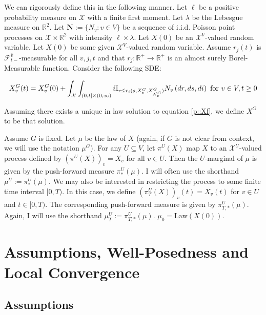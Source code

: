 \documentclass[12pt]{article}
\newcommand{\mb}{\mathbb}
\newcommand{\mc}{\mathcal}
\newcommand{\ra}{\rightarrow}
\newcommand{\ov}{\overline}
\newcommand{\te}{\text}
\newcommand{\ind}{\hspace{24pt}}
\newcommand{\defeq}{:=}								%
\newcommand{\sta}{\mc{X}}							%
\newcommand{\gneigh}[2]{\mc{N}^{#1}_{#2}}			%
\newcommand{\cl}[1]{\ov{#1}}						%
\newcommand{\Xf}{X}									%
\newcommand{\poiss}{N}								%
\newcommand{\leb}{\lambda}							%
\newcommand{\Sm}{\ell}								%
\newcommand{\rate}{r}								%
\newcommand{\F}{\mc{F}}								%
\newcommand{\m}{\mu}								%
\newcommand{\proj}{\pi}								%
\newcommand{\poisses}{\mathbf{N}}					%
\newcommand{\poissv}[1]{_{#1}}						%
\newcommand{\vind}[1]{_{#1}}						%
\newcommand{\tme}[1]{(#1)}							%
\newcommand{\gind}[1]{^{#1}}						%
\newcommand{\vpara}[1]{^{#1}}						%
\newcommand{\stpara}[1]{_{#1}}						%
\newcommand{\tpara}[1]{_{#1}}						%
\newcommand{\psf}{_*}								%
\newcommand{\tparapsf}[1]{_{#1,*}}					%
\newcommand{\tmepro}[3]{
\ifstrempty{#3}{
	(#1,#2)}{
	(#1,#2,#3)}}									%
\newcommand{\law}{\te{Law}}							%
\begin{document}
\ind We can rigorously define this in the following manner. Let \(\Sm\) be a positive probability measure on \(\sta\) with a finite first moment. Let \(\leb\) be the Lebesgue measure on \(\mb{R}^2\). Let \(\poisses \defeq \{\poiss\poissv{v}:v \in V\}\) be a sequence of i.i.d. Poisson point processes on \(\sta\times \mb{R}^2\) with intensity \(\Sm\times \leb\). Let \(\Xf\tme{0}\) be an \(\sta^V\)-valued random variable. Let \(\Xf\tme{0}\) be some given \(\sta^V\)-valued random variable. Assume \(\rate\stpara{j}(t)\) is \(\F\vpara{\cl{v}}\tpara{t-}\)-measurable for all \(v,j,t\) and that \(\rate\stpara{j}:\mb{R}^+ \ra\mb{R}^+\) is an almost surely Borel-Measurable function. Consider the following SDE:

\begin{equation}
\Xf\gind{G}\vind{v}\tme{t} = \Xf\gind{G}\vind{v}\tme{0} + \int_{\sta}\int_{(0,t]\times (0,\infty)} i\mb{I}_{r \leq \rate\stpara{i}\tmepro{s}{\Xf\gind{G}\vind{v}}{\Xf\gind{G}\vind{\gneigh{G}{v}}}} \poiss\poissv{v}\left(dr,ds,di\right) \te{ for } v\in V, t \geq 0
\label{p::Xf}
\end{equation}

Assuming there exists a unique in law solution to equation \eqref{p::Xf}, we define \(\Xf\gind{G}\) to be that solution. 

\ind Assume \(G\) is fixed. Let \(\m\) be the law of \(\Xf\) (again, if \(G\) is not clear from context, we will use the notation \(\m\gind{G}\)). For any \(U \subseteq V\), let \(\proj\vpara{U}(\Xf)\) map \(\Xf\) to an \(\sta^U\)-valued process defined by \((\proj\vpara{U}(\Xf))\vind{v} = \Xf\vind{v}\) for all \(v\in U\). Then the \(U\)-marginal of \(\m\) is given by the push-forward measure \(\proj\vpara{U}\psf(\m)\). I will often use the shorthand \(\m\vpara{U} \defeq \proj\psf\vpara{U}(\m)\). We may also be interested in restricting the process to some finite time interval \([0,T)\). In this case, we define \((\proj\vpara{U}\tpara{T}(\Xf))\vind{v}\tme{t} = \Xf\vind{v}\tme{t}\) for \(v \in U\) and \(t \in [0,T)\). The corresponding push-forward measure is given by \(\proj\vpara{U}\tparapsf{T}(\m)\). Again, I will use the shorthand \(\m\vpara{U}\tpara{T} \defeq \proj\vpara{U}\tparapsf{T}(\m)\). \(\m\tpara{0} = \law(\Xf\tme{0})\).

\section{Assumptions, Well-Posedness and Local Convergence}
\label{awl}
\subsection{Assumptions}
\label{awl::a}
\end{document}
